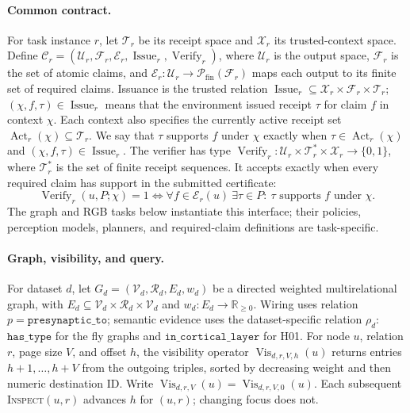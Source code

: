 \documentclass{article}
\newcommand{\presyn}{\mathtt{presynaptic\_to}}
\newcommand{\Vis}{\operatorname{Vis}}
\begin{document}
\paragraph{Common contract.}
For task instance $r$, let $\mathcal T_r$ be its receipt space and
$\mathcal X_r$ its trusted-context space. Define
$\mathcal C_r=(\mathcal U_r,\mathcal F_r,\mathcal E_r,
\operatorname{Issue}_r,\operatorname{Verify}_r)$, where $\mathcal U_r$ is the
output space, $\mathcal F_r$ is the set of atomic claims, and
$\mathcal E_r:\mathcal U_r\to\mathcal P_{\mathrm{fin}}(\mathcal F_r)$ maps
each output to its finite set of required claims. Issuance is the trusted relation
$\operatorname{Issue}_r\subseteq\mathcal X_r\times\mathcal F_r\times\mathcal T_r$;
$(\chi,f,\tau)\in\operatorname{Issue}_r$ means that the environment issued
receipt $\tau$ for claim $f$ in context $\chi$. Each context also specifies
the currently active receipt set $\operatorname{Act}_r(\chi)\subseteq\mathcal T_r$.
We say that $\tau$ supports $f$ under $\chi$ exactly when
$\tau\in\operatorname{Act}_r(\chi)$ and
$(\chi,f,\tau)\in\operatorname{Issue}_r$. The verifier has type
$\operatorname{Verify}_r:\mathcal U_r\times\mathcal T_r^*\times\mathcal X_r\to\{0,1\}$,
where $\mathcal T_r^*$ is the set of finite receipt sequences.
It accepts exactly when every required claim has support in the submitted
certificate:
\[
 \operatorname{Verify}_r(u,P;\chi)=1
 \iff \forall f\in\mathcal E_r(u)\ \exists\tau\in P:\
 \tau\text{ supports }f\text{ under }\chi.
\]
The graph and RGB tasks below instantiate this interface; their policies,
perception models, planners, and required-claim definitions are task-specific.

\paragraph{Graph, visibility, and query.}
For dataset \(d\), let
\(G_d=(\mathcal V_d,\mathcal R_d,E_d,w_d)\) be a directed weighted
multirelational graph, with
\(E_d\subseteq\mathcal V_d\times\mathcal R_d\times\mathcal V_d\) and
\(w_d:E_d\to\mathbb R_{\geq0}\). Wiring uses relation \(p=\presyn\);
semantic evidence uses the dataset-specific relation \(\rho_d\):
\(\mathtt{has\_type}\) for the fly graphs and
\(\mathtt{in\_cortical\_layer}\) for H01.
For node \(u\), relation \(r\), page size $V$, and offset \(h\), the
visibility operator \(\Vis_{d,r,V,h}(u)\) returns entries \(h+1,\ldots,h+V\)
from the outgoing triples, sorted by decreasing weight and then numeric
destination ID. Write \(\Vis_{d,r,V}(u)=\Vis_{d,r,V,0}(u)\).
Each subsequent \textsc{Inspect}\((u,r)\) advances \(h\) for \((u,r)\);
changing focus does not.
\end{document}
